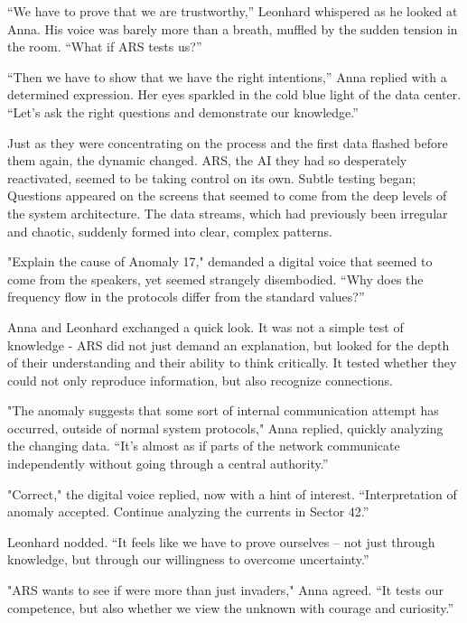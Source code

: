 \documentclass[
]{article}
\begin{document}
``We have to prove that we are trustworthy,'' Leonhard whispered as he
looked at Anna. His voice was barely more than a breath, muffled by the
sudden tension in the room. ``What if ARS tests us?''

``Then we have to show that we have the right intentions,'' Anna replied
with a determined expression. Her eyes sparkled in the cold blue light
of the data center. ``Let's ask the right questions and demonstrate our
knowledge.''

Just as they were concentrating on the process and the first data
flashed before them again, the dynamic changed. ARS, the AI
\hspace{0pt}\hspace{0pt}they had so desperately reactivated, seemed to
be taking control on its own. Subtle testing began; Questions appeared
on the screens that seemed to come from the deep levels of the system
architecture. The data streams, which had previously been irregular and
chaotic, suddenly formed into clear, complex patterns.

"Explain the cause of Anomaly 17," demanded a digital voice that seemed
to come from the speakers, yet seemed strangely disembodied. ``Why does
the frequency flow in the protocols differ from the standard values?''

Anna and Leonhard exchanged a quick look. It was not a simple test of
knowledge - ARS did not just demand an explanation, but looked for the
depth of their understanding and their ability to think critically. It
tested whether they could not only reproduce information, but also
recognize connections.

"The anomaly suggests that some sort of internal communication attempt
has occurred, outside of normal system protocols," Anna replied, quickly
analyzing the changing data. ``It's almost as if parts of the network
communicate independently without going through a central authority.''

"Correct," the digital voice replied, now with a hint of interest.
``Interpretation of anomaly accepted. Continue analyzing the currents in
Sector 42.''

Leonhard nodded. ``It feels like we have to prove ourselves -- not just
through knowledge, but through our willingness to overcome
uncertainty.''

"ARS wants to see if we\textquotesingle re more than just invaders,"
Anna agreed. ``It tests our competence, but also whether we view the
unknown with courage and curiosity.''
\end{document}
